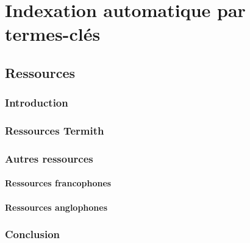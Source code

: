 \part{Indexation automatique par termes-clés}
\label{part:main-automatic_keyphrase_annotation}


  \chapter{Ressources}
  \label{chap:main-automatic_keyphrase_annotation-resources}
    \section{Introduction}
    \label{sec:main-automatic_keyphrase_annotation-resources-introduction}

    \section{Ressources Termith }
    \label{sec:main-automatic_keyphrase_annotation-resources-termith_resources}

    \section{Autres ressources}
    \label{sec:main-automatic_keyphrase_annotation-resources-other_resources}
      \subsection{Ressources francophones}
      \label{sec:main-automatic_keyphrase_annotation-resources-other_resources-french_resources}

      \subsection{Ressources anglophones}
      \label{sec:main-automatic_keyphrase_annotation-resources-other_resources-english_resources}

    \section{Conclusion}
    \label{sec:main-automatic_keyphrase_annotation-resources-conclusion}


